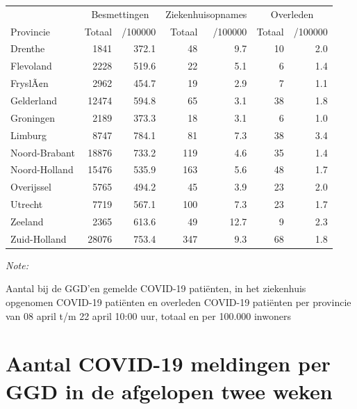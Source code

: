 \documentclass[
  english,
  man,floatsintext]{apa6}
\begin{document}
\begin{table}
\centering
\begin{threeparttable}
\begin{tabular}{lrrrrrr}
\toprule
\multicolumn{1}{c}{ } & \multicolumn{2}{c}{Besmettingen} & \multicolumn{2}{c}{Ziekenhuisopnames} & \multicolumn{2}{c}{Overleden} \\
\cmidrule(l{3pt}r{3pt}){2-3} \cmidrule(l{3pt}r{3pt}){4-5} \cmidrule(l{3pt}r{3pt}){6-7}
Provincie & Totaal & /100000 & Totaal & /100000 & Totaal & /100000\\
\midrule
Drenthe & 1841 & 372.1 & 48 & 9.7 & 10 & 2.0\\
Flevoland & 2228 & 519.6 & 22 & 5.1 & 6 & 1.4\\
FryslÃ¢n & 2962 & 454.7 & 19 & 2.9 & 7 & 1.1\\
Gelderland & 12474 & 594.8 & 65 & 3.1 & 38 & 1.8\\
Groningen & 2189 & 373.3 & 18 & 3.1 & 6 & 1.0\\
Limburg & 8747 & 784.1 & 81 & 7.3 & 38 & 3.4\\
Noord-Brabant & 18876 & 733.2 & 119 & 4.6 & 35 & 1.4\\
Noord-Holland & 15476 & 535.9 & 163 & 5.6 & 48 & 1.7\\
Overijssel & 5765 & 494.2 & 45 & 3.9 & 23 & 2.0\\
Utrecht & 7719 & 567.1 & 100 & 7.3 & 23 & 1.7\\
Zeeland & 2365 & 613.6 & 49 & 12.7 & 9 & 2.3\\
Zuid-Holland & 28076 & 753.4 & 347 & 9.3 & 68 & 1.8\\
\bottomrule
\end{tabular}
\begin{tablenotes}
\item \textit{Note: } 
\item Aantal bij de GGD’en gemelde COVID-19 patiënten, in het ziekenhuis opgenomen COVID-19 patiënten en overleden COVID-19 patiënten per provincie van 08 april t/m 22 april 10:00 uur, totaal en per 100.000 inwoners
\end{tablenotes}
\end{threeparttable}
\end{table}

\newpage

\hypertarget{aantal-covid-19-meldingen-per-ggd-in-de-afgelopen-twee-weken}{%
\section{Aantal COVID-19 meldingen per GGD in de afgelopen twee weken}\label{aantal-covid-19-meldingen-per-ggd-in-de-afgelopen-twee-weken}}
\end{document}
